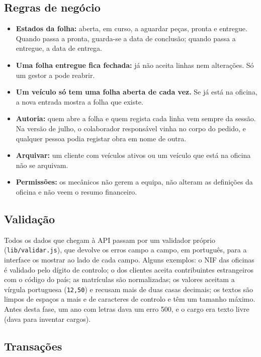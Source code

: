 \documentclass[a4paper,12pt]{article}
\begin{document}
\subsection{Regras de negócio}

\begin{itemize}
    \item \textbf{Estados da folha:} aberta, em curso, a aguardar peças, pronta e entregue. Quando passa a pronta, guarda-se a data de conclusão; quando passa a entregue, a data de entrega.
    \item \textbf{Uma folha entregue fica fechada:} já não aceita linhas nem alterações. Só um gestor a pode reabrir.
    \item \textbf{Um veículo só tem uma folha aberta de cada vez.} Se já está na oficina, a nova entrada mostra a folha que existe.
    \item \textbf{Autoria:} quem abre a folha e quem regista cada linha vem sempre da sessão. Na versão de julho, o colaborador responsável vinha no corpo do pedido, e qualquer pessoa podia registar obra em nome de outra.
    \item \textbf{Arquivar:} um cliente com veículos ativos ou um veículo que está na oficina não se arquivam.
    \item \textbf{Permissões:} os mecânicos não gerem a equipa, não alteram as definições da oficina e não veem o resumo financeiro.
\end{itemize}

\subsection{Validação}

Todos os dados que chegam à \ac{API} passam por um validador próprio (\texttt{lib/validar.js}), que devolve os erros campo a campo, em português, para a interface os mostrar ao lado de cada campo. Alguns exemplos: o \ac{NIF} das oficinas é validado pelo dígito de controlo; o dos clientes aceita contribuintes estrangeiros com o código do país; as matrículas são normalizadas; os valores aceitam a vírgula portuguesa (\texttt{12,50}) e recusam mais de duas casas decimais; os textos são limpos de espaços a mais e de caracteres de controlo e têm um tamanho máximo. Antes desta fase, um ano com letras dava um erro 500, e o cargo era texto livre (dava para inventar cargos).

\subsection{Transações}
\end{document}

